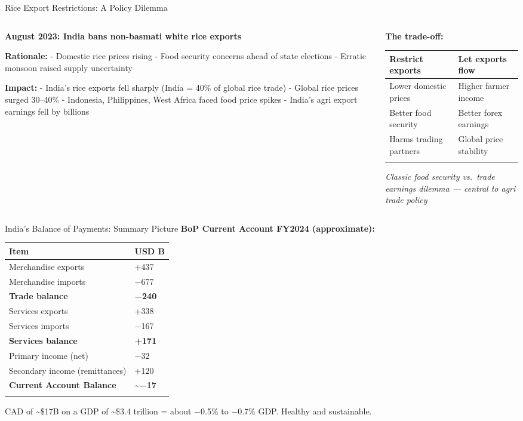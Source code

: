 \documentclass[
  ignorenonframetext,
  aspectratio=169,
]{beamer}
\makeatletter
\let\quarto@originallabel\label
\DeclareRobustCommand*{\label}[1]{\quarto@originallabel{#1}}
\makeatother
\begin{document}
\begin{frame}{Rice Export Restrictions: A Policy Dilemma}
\label{rice-export-restrictions-a-policy-dilemma}
\begin{columns}[T]
\begin{column}{0.6\linewidth}
\textbf{August 2023: India bans non-basmati white rice exports}

\textbf{Rationale:} - Domestic rice prices rising - Food security
concerns ahead of state elections - Erratic monsoon raised supply
uncertainty

\textbf{Impact:} - India's rice exports fell sharply (India = 40\% of
global rice trade) - Global rice prices surged 30--40\% - Indonesia,
Philippines, West Africa faced food price spikes - India's agri export
earnings fell by billions
\end{column}

\begin{column}{0.4\linewidth}
\textbf{The trade-off:}

\begin{longtable}[]{@{}ll@{}}
\toprule\noalign{}
Restrict exports & Let exports flow \\
\midrule\noalign{}
\endhead
Lower domestic prices & Higher farmer income \\
Better food security & Better forex earnings \\
Harms trading partners & Global price stability \\
\bottomrule\noalign{}
\end{longtable}

\emph{Classic food security vs.~trade earnings dilemma --- central to
agri trade policy}
\end{column}
\end{columns}
\end{frame}

\begin{frame}{India's Balance of Payments: Summary Picture}
\label{indias-balance-of-payments-summary-picture}
\textbf{BoP Current Account FY2024 (approximate):}

\begin{longtable}[]{@{}ll@{}}
\toprule\noalign{}
Item & USD B \\
\midrule\noalign{}
\endhead
Merchandise exports & +437 \\
Merchandise imports & −677 \\
\textbf{Trade balance} & \textbf{−240} \\
Services exports & +338 \\
Services imports & −167 \\
\textbf{Services balance} & \textbf{+171} \\
Primary income (net) & −32 \\
Secondary income (remittances) & +120 \\
\textbf{Current Account Balance} & \textbf{\textasciitilde−17} \\
\bottomrule\noalign{}
\end{longtable}

CAD of \textasciitilde\$17B on a GDP of \textasciitilde\$3.4 trillion =
about −0.5\% to −0.7\% GDP. Healthy and sustainable.
\end{frame}
\end{document}
